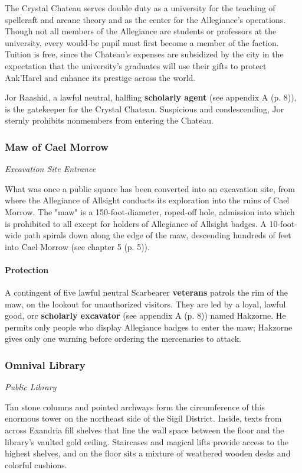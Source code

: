 \documentclass[letterpaper, 11pt, bg=full, twocolumn]{dndbook}
\begin{document}
The Crystal Chateau serves double duty as a university for the teaching of spellcraft and arcane theory and as the center for the Allegiance's operations. Though not all members of the Allegiance are students or professors at the university, every would-be pupil must first become a member of the faction. Tuition is free, since the Chateau's expenses are subsidized by the city in the expectation that the university's graduates will use their gifts to protect Ank'Harel and enhance its prestige across the world.

Jor Raashid, a lawful neutral, halfling \textbf{scholarly agent} (see appendix A (p. 8)), is the gatekeeper for the Crystal Chateau. Suspicious and condescending, Jor sternly prohibits nonmembers from entering the Chateau.

\subsubsection{Maw of Cael Morrow}

\textit{Excavation Site Entrance}

What was once a public square has been converted into an excavation site, from where the Allegiance of Allsight conducts its exploration into the ruins of Cael Morrow. The "maw" is a 150-foot-diameter, roped-off hole, admission into which is prohibited to all except for holders of Allegiance of Allsight badges. A 10-foot-wide path spirals down along the edge of the maw, descending hundreds of feet into Cael Morrow (see chapter 5 (p. 5)).

\paragraph{Protection}

A contingent of five lawful neutral Scarbearer \textbf{veterans} patrols the rim of the maw, on the lookout for unauthorized visitors. They are led by a loyal, lawful good, orc \textbf{scholarly excavator} (see appendix A (p. 8)) named Hakzorne. He permits only people who display Allegiance badges to enter the maw; Hakzorne gives only one warning before ordering the mercenaries to attack.

\subsubsection{Omnival Library}

\textit{Public Library}

Tan stone columns and pointed archways form the circumference of this enormous tower on the northeast side of the Sigil District. Inside, texts from across Exandria fill shelves that line the wall space between the floor and the library's vaulted gold ceiling. Staircases and magical lifts provide access to the highest shelves, and on the floor sits a mixture of weathered wooden desks and colorful cushions.
\end{document}
